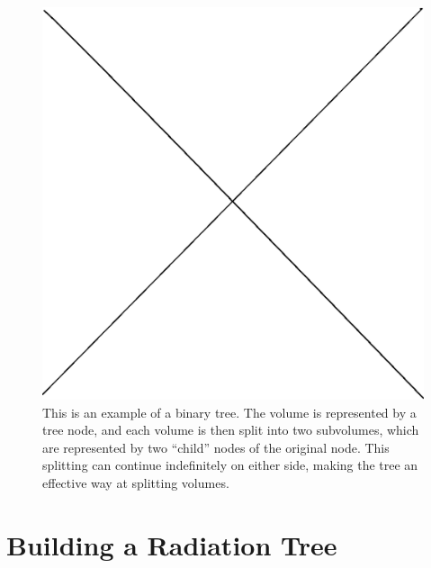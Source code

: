 \begin{figure}
\includegraphics[width=\textwidth]{graphics/placeholder.eps}
\caption[Examples of trees.]{This is an example of a binary tree. The volume is represented by a tree node, and each volume is then split into two subvolumes, which are represented by two ``child'' nodes of the original node. This splitting can continue indefinitely on either side, making the tree an effective way at splitting volumes.}
\label{fig:trees}
\end{figure}

\section{Building a Radiation Tree}
\label{sec:buildingtree}

